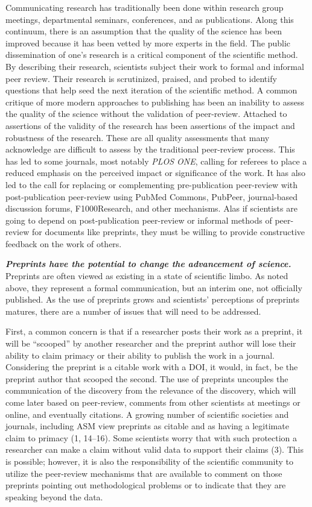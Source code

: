 \documentclass[11pt,]{article}
\begin{document}
Communicating research has traditionally been done within research group
meetings, departmental seminars, conferences, and as publications. Along
this continuum, there is an assumption that the quality of the science
has been improved because it has been vetted by more experts in the
field. The public dissemination of one's research is a critical
component of the scientific method. By describing their research,
scientists subject their work to formal and informal peer review. Their
research is scrutinized, praised, and probed to identify questions that
help seed the next iteration of the scientific method. A common critique
of more modern approaches to publishing has been an inability to assess
the quality of the science without the validation of peer-review.
Attached to assertions of the validity of the research has been
assertions of the impact and robustness of the research. These are all
quality assessments that many acknowledge are difficult to assess by the
traditional peer-review process. This has led to some journals, most
notably \emph{PLOS ONE}, calling for referees to place a reduced
emphasis on the perceived impact or significance of the work. It has
also led to the call for replacing or complementing pre-publication
peer-review with post-publication peer-review using PubMed Commons,
PubPeer, journal-based discussion forums, F1000Research, and other
mechanisms. Alas if scientists are going to depend on post-publication
peer-review or informal methods of peer-review for documents like
preprints, they must be willing to provide constructive feedback on the
work of others.

\textbf{\emph{Preprints have the potential to change the advancement of
science.}} Preprints are often viewed as existing in a state of
scientific limbo. As noted above, they represent a formal communication,
but an interim one, not officially published. As the use of preprints
grows and scientists' perceptions of preprints matures, there are a
number of issues that will need to be addressed.

First, a common concern is that if a researcher posts their work as a
preprint, it will be ``scooped'' by another researcher and the preprint
author will lose their ability to claim primacy or their ability to
publish the work in a journal. Considering the preprint is a citable
work with a DOI, it would, in fact, be the preprint author that scooped
the second. The use of preprints uncouples the communication of the
discovery from the relevance of the discovery, which will come later
based on peer-review, comments from other scientists at meetings or
online, and eventually citations. A growing number of scientific
societies and journals, including ASM view preprints as citable and as
having a legitimate claim to primacy (1, 14--16). Some scientists worry
that with such protection a researcher can make a claim without valid
data to support their claims (3). This is possible; however, it is also
the responsibility of the scientific community to utilize the
peer-review mechanisms that are available to comment on those preprints
pointing out methodological problems or to indicate that they are
speaking beyond the data.
\end{document}
